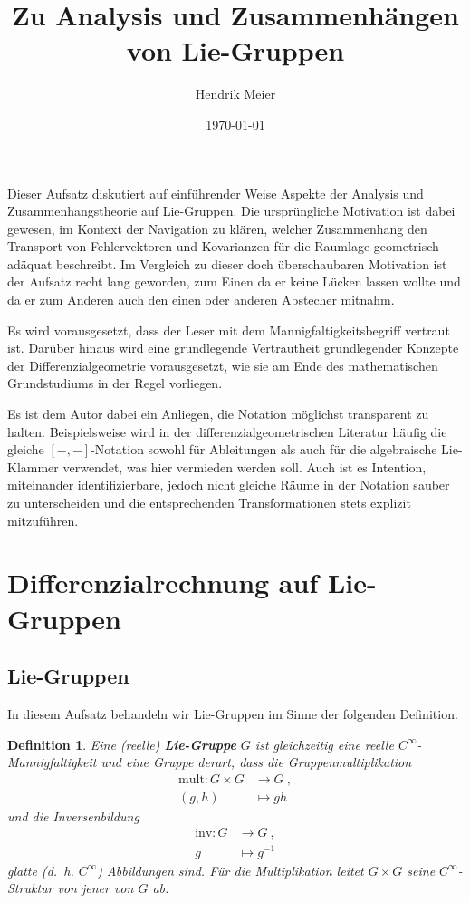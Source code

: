 \documentclass[10pt,a4paper]{article}
\title{Zu Analysis und Zusammenhängen von Lie-Gruppen}
\author{Hendrik Meier}
\affil{Oberuhldingen}
\affil{}
\date{\today}
\theoremstyle{mytheorem}
\theoremstyle{mydefinition}
\newtheorem{definition}[theorem]{Definition}
\newcommand{\mydef}[1]{\textbf{\textit{#1}}}
\begin{document}
\maketitle

Dieser Aufsatz diskutiert auf einführender Weise Aspekte der Analysis und Zusammenhangstheorie auf Lie-Gruppen.
Die ursprüngliche Motivation ist dabei gewesen, im Kontext der Navigation zu klären, welcher Zusammenhang den Transport von Fehlervektoren und Kovarianzen für die Raumlage geometrisch adäquat beschreibt.
Im Vergleich zu dieser doch überschaubaren Motivation ist der Aufsatz recht lang geworden, zum Einen da er keine Lücken lassen wollte und da er zum Anderen auch den einen oder anderen Abstecher mitnahm.

Es wird vorausgesetzt, dass der Leser mit dem Mannigfaltigkeitsbegriff vertraut ist.
Darüber hinaus wird eine grundlegende Vertrautheit grundlegender Konzepte der Differenzialgeometrie vorausgesetzt, wie sie am Ende des mathematischen Grundstudiums in der Regel vorliegen.

Es ist dem Autor dabei ein Anliegen, die Notation möglichst transparent zu halten. Beispielsweise wird in der differenzialgeometrischen Literatur häufig die gleiche $[-,-]$-Notation sowohl für Ableitungen als auch für die algebraische Lie-Klammer verwendet, was hier vermieden werden soll.
Auch ist es Intention, miteinander identifizierbare, jedoch nicht gleiche Räume in der Notation sauber zu unterscheiden und die entsprechenden Transformationen stets explizit mitzuführen.

\section{Differenzialrechnung auf Lie-Gruppen}

\subsection{Lie-Gruppen}

In diesem Aufsatz behandeln wir Lie-Gruppen im Sinne der folgenden Definition.

\begin{definition}
Eine (reelle) \mydef{Lie-Gruppe} $G$ ist gleichzeitig eine reelle $C^\infty$-Mannigfaltigkeit und eine Gruppe derart, dass die Gruppenmultiplikation
\begin{align*}
	\mathrm{mult}:
	G\times G&\rightarrow G
	\ ,\nonumber\\
	(g, h) &\mapsto gh
\end{align*}
und die Inversenbildung
\begin{align*}
	\mathrm{inv}:
	G&\rightarrow G
	\ ,\nonumber\\
	g &\mapsto g^{-1}
\end{align*}
glatte (d.~h. $C^\infty$) Abbildungen sind.
Für die Multiplikation leitet $G\times G$ seine $C^\infty$-Struktur von jener von $G$ ab.
\end{definition}
\end{document}
